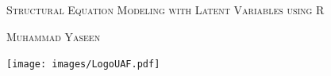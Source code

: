 \raggedbottom %




\pagestyle{plain} %





\begin{titlepage}

\begin{addmargin}[-1cm]{-3cm}
\begin{center}
\Huge


\hfill
\vfill

\begingroup
\color{Maroon}\textsc{Structural Equation Modeling with Latent Variables using R} \\ \bigskip %

\endgroup

\huge
\textsc{Muhammad Yaseen} %

\vfill

\texttt{[image: images/LogoUAF.pdf]} \\ \medskip %



\vfill

\end{center}
\end{addmargin}

\end{titlepage}

